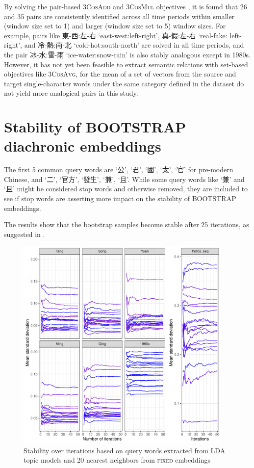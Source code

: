 By solving the pair-based \textsc{3CosAdd} and \textsc{3CosMul} objectives \parencite{levy2014linguistic}, it is found that 26 and 35 pairs are consistently identified across all time periods within smaller (window size set to 1) and larger (window size set to 5) window sizes. For example, pairs like 東-西:左-右 `east-west:left-right', 真-假:左-右 `real-fake: left-right', and 冷-熱:南-北 `cold-hot:south-north' are solved in all time periods, and the pair 冰-水:雪-雨 `ice-water:snow-rain' is also stably analogous except in 1980s. However, it has not yet been feasible to extract semantic relations with set-based objectives like \textsc{3CosAvg}, for the mean of a set of vectors from the source and target single-character words under the same category defined in the dataset do not yield more analogical pairs in this study. %

\section{Stability of \textsc{BOOTSTRAP} diachronic embeddings}

The first 5 common query words are `公', `君', `國', `太', `官' for pre-modern Chinese, and `二', `官方', `發生', `兼', `且'. While some query words like `兼' and `且' might be considered stop words and otherwise removed, they are included to see if stop words are asserting more impact on the stability of \textsc{BOOTSTRAP} embeddings.

The results show that the bootstrap samples become stable after 25 iterations, as suggested in \textcite{antoniak2018evaluating}. 

\begin{figure}[H]
  \centering
  \includegraphics[width=0.95\textwidth,keepaspectratio]{figures/stability_plot_mean_std}
  \caption{Stability over iterations based on query words extracted from LDA topic models and 20 nearest neighbors from \textsc{fixed} embeddings}
  \end{figure}


